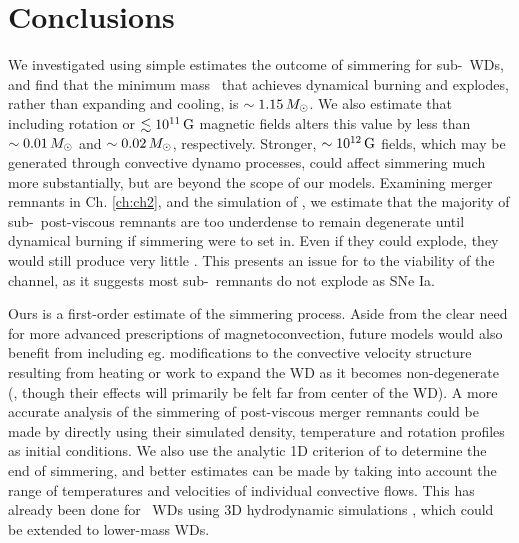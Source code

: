 \section{Conclusions}
\label{ssec:c5_conclusions}

We investigated using simple estimates the outcome of simmering for sub-\Mch\ WDs, and find that the minimum mass \Mcrit\ that achieves dynamical burning and explodes, rather than expanding and cooling, is $\sim1.15\,\Msun$.  We also estimate that including rotation or $\lesssim 10^{11}\,\mathrm{G}$ magnetic fields alters this value by less than $\sim0.01\,\Msun$ and $\sim0.02\,\Msun$, respectively.  Stronger, $\sim10^{12}\,\mathrm{G}$ fields, which may be generated through convective dynamo processes, could affect simmering much more substantially, but are beyond the scope of our models.  Examining merger remnants in Ch. \ref{ch:ch2}, and the simulation of \cite{ji+13}, we estimate that the majority of sub-\Mch\ post-viscous remnants are too underdense to remain degenerate until dynamical burning if simmering were to set in.  Even if they could explode, they would still produce very little \Ni.  This presents an issue for to the viability of the \citeal{vkercj10} channel, as it suggests most sub-\Mch\ remnants do not explode as SNe Ia.


Ours is a first-order estimate of the simmering process.  Aside from the clear need for more advanced prescriptions of magnetoconvection, future models would also benefit from including eg. modifications to the convective velocity structure resulting from heating or work to expand the WD as it becomes non-degenerate (\citeal{piroc08}, though their effects will primarily be felt far from center of the WD).  A more accurate analysis of the simmering of post-viscous merger remnants could be made by directly using their simulated density, temperature and rotation profiles as initial conditions.  We also use the analytic 1D criterion of \citeal{wooswk04} to determine the end of simmering, and better estimates can be made by taking into account the range of temperatures and velocities of individual convective flows.  This has already been done for \Mch\ WDs using 3D hydrodynamic simulations \citep{kuhlwg06, zing+09, zing+11, nona+12}, which could be extended to lower-mass WDs.


